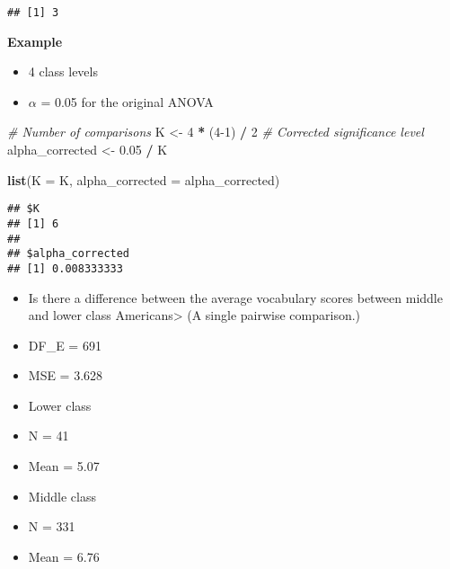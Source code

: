 \documentclass[]{book}
\newenvironment{Shaded}{\begin{snugshade}}{\end{snugshade}}
\newcommand{\CommentTok}[1]{\textcolor[rgb]{0.56,0.35,0.01}{\textit{#1}}}
\newcommand{\DataTypeTok}[1]{\textcolor[rgb]{0.13,0.29,0.53}{#1}}
\newcommand{\DecValTok}[1]{\textcolor[rgb]{0.00,0.00,0.81}{#1}}
\newcommand{\FloatTok}[1]{\textcolor[rgb]{0.00,0.00,0.81}{#1}}
\newcommand{\KeywordTok}[1]{\textcolor[rgb]{0.13,0.29,0.53}{\textbf{#1}}}
\newcommand{\NormalTok}[1]{#1}
\newcommand{\OperatorTok}[1]{\textcolor[rgb]{0.81,0.36,0.00}{\textbf{#1}}}
\newcommand{\StringTok}[1]{\textcolor[rgb]{0.31,0.60,0.02}{#1}}
\providecommand{\tightlist}{%
  \setlength{\itemsep}{0pt}\setlength{\parskip}{0pt}}
\begin{document}
\begin{verbatim}
## [1] 3
\end{verbatim}

\textbf{Example}

\begin{itemize}
\tightlist
\item
  4 class levels
\item
  \(\alpha\) = 0.05 for the original ANOVA
\end{itemize}

\begin{Shaded}
\begin{Highlighting}[]
\CommentTok{# Number of comparisons}
\NormalTok{K <-}\StringTok{ }\DecValTok{4} \OperatorTok{*}\StringTok{ }\NormalTok{(}\DecValTok{4-1}\NormalTok{) }\OperatorTok{/}\StringTok{ }\DecValTok{2}
\CommentTok{# Corrected significance level}
\NormalTok{alpha_corrected <-}\StringTok{ }\FloatTok{0.05} \OperatorTok{/}\StringTok{ }\NormalTok{K}

\KeywordTok{list}\NormalTok{(}\DataTypeTok{K =}\NormalTok{ K, }\DataTypeTok{alpha_corrected =}\NormalTok{ alpha_corrected)}
\end{Highlighting}
\end{Shaded}

\begin{verbatim}
## $K
## [1] 6
## 
## $alpha_corrected
## [1] 0.008333333
\end{verbatim}

\begin{itemize}
\tightlist
\item
  Is there a difference between the average vocabulary scores between middle and lower class Americans\textgreater{} (A single pairwise comparison.)
\item
  DF\_E = 691
\item
  MSE = 3.628
\item
  Lower class
\item
  N = 41
\item
  Mean = 5.07
\item
  Middle class
\item
  N = 331
\item
  Mean = 6.76
\end{itemize}
\end{document}
